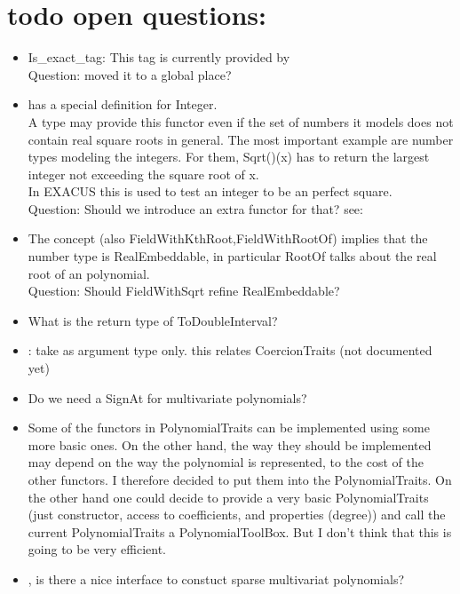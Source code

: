 


\section{todo open questions:}

\begin{itemize} 
\item Is\_exact\_tag: This tag is currently provided by \\
Question: moved it to a global place? 
\item {} has a special definition for Integer. \\
        A type may provide this functor even if the set of 
        numbers it models does not contain real square roots in general. 
        The most important example are number types modeling the integers. 
        For them, Sqrt()(x) has to return the largest integer not exceeding 
        the square root of x.\\
        In EXACUS this is used to test an integer to be an perfect square. \\
        Question: Should we introduce an extra functor for that?
        see: 
\item The concept  (also FieldWithKthRoot,FieldWithRootOf) 
      implies that the number type is RealEmbeddable, in particular RootOf talks 
      about the real root of an polynomial.\\
      Question: Should FieldWithSqrt refine RealEmbeddable?  
\item What is the return type of ToDoubleInterval?     
\item {}: take  as argument type only.
      this relates CoercionTraits (not documented yet) 
\item Do we need a SignAt for multivariate polynomials?
\item Some of the functors in PolynomialTraits can be implemented using some more basic ones. 
      On the other hand, the way they should be implemented may depend on  the way the polynomial is 
      represented, to the cost of the other functors. 
      I therefore decided to put them into the PolynomialTraits. 
      On the other hand one could decide to provide a very basic PolynomialTraits 
      (just constructor, access to coefficients, and properties (degree)) and call the current 
      PolynomialTraits a PolynomialToolBox. But I don't think that this is going to be very efficient. 
\item {}, is there a nice interface to 
      constuct sparse multivariat polynomials?
\end{itemize}

